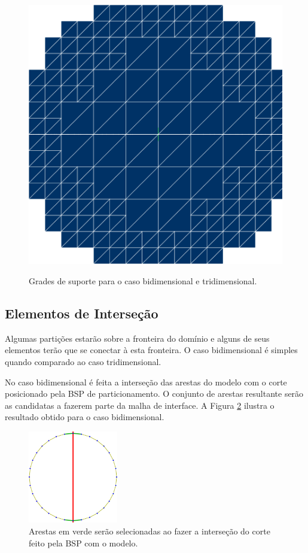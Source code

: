 \begin{figure}[!ht]
{     		\begin{minipage}[c]{0.4\textwidth}{\includegraphics[width=\textwidth]{fig/esfera3_grade.png}}\end{minipage}
     	}    
     	\caption{Grades de suporte para o caso bidimensional e tridimensional.}
     	\label{fig:grades_modelos}
     \end{figure}
     
        
\subsection{Elementos de Interseção}
\label{sec:Elementos_Intersecao}

Algumas partições estarão sobre a fronteira do domínio e alguns de seus elementos terão que se conectar à esta fronteira. O caso bidimensional é simples quando comparado ao caso tridimensional.

No caso bidimensional é feita a interseção das arestas do modelo com o corte posicionado pela BSP de particionamento. O conjunto de arestas resultante serão as candidatas a fazerem parte da malha de interface. A Figura \ref{fig:circulo_arestas} ilustra o resultado obtido para o caso bidimensional.


\begin{figure}[!ht]
	\centering
	\includegraphics[width=0.35\textwidth]{fig/circulo2_arestas.png}
	\caption{Arestas em verde serão selecionadas ao fazer a interseção do corte feito pela BSP com o modelo.}
	\label{fig:circulo_arestas}
\end{figure}


